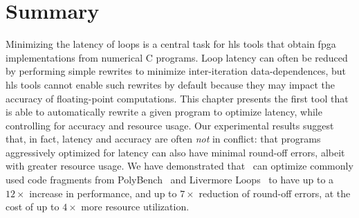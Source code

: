 \section{Summary}
\label{lo:sec:conclusion}

Minimizing the latency of loops is a central task for \gls{hls} tools that
obtain \gls{fpga} implementations from numerical C programs.  Loop latency can
often be reduced by performing simple rewrites to minimize inter-iteration
data-dependences, but \gls{hls} tools cannot enable such rewrites by default
because they may impact the accuracy of floating-point computations.  This
chapter presents the first tool that is able to automatically rewrite a given
program to optimize latency, while controlling for accuracy and resource usage.
Our experimental results suggest that, in fact, latency and accuracy are often
\emph{not} in conflict: that programs aggressively optimized for latency can
also have minimal round-off errors, albeit with greater resource usage.  We
have demonstrated that \soap~can optimize commonly used code fragments from
PolyBench~\cite{polybench} and Livermore Loops~\cite{livermore} to have up to a
$12\times$ increase in performance, and up to $7\times$ reduction of round-off
errors, at the cost of up to $4\times$ more resource utilization.
